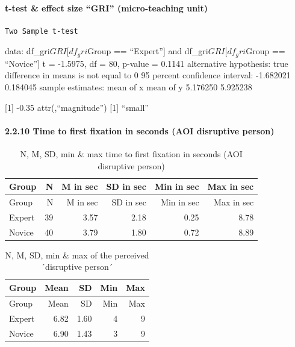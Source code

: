 \documentclass[
]{article}
\begin{document}
\paragraph{t-test \& effect size ``GRI'' (micro-teaching
unit)}\label{t-test-effect-size-gri-micro-teaching-unit}

\begin{verbatim}
Two Sample t-test
\end{verbatim}

data: df\_gri\(GRI[df_gri\)Group == ``Expert''{]} and
df\_gri\(GRI[df_gri\)Group == ``Novice''{]} t = -1.5975, df = 80,
p-value = 0.1141 alternative hypothesis: true difference in means is not
equal to 0 95 percent confidence interval: -1.682021 0.184045 sample
estimates: mean of x mean of y 5.176250 5.925238

{[}1{]} -0.35 attr(,``magnitude'') {[}1{]} ``small''

\paragraph{2.2.10 Time to first fixation in seconds (AOI disruptive
person)}\label{time-to-first-fixation-in-seconds-aoi-disruptive-person}

\begin{longtable}[]{@{}lrrrrr@{}}
\caption{N, M, SD, min \& max time to first fixation in seconds (AOI
disruptive person)}\tabularnewline
\toprule\noalign{}
Group & N & M in sec & SD in sec & Min in sec & Max in sec \\
\midrule\noalign{}
\endfirsthead
\toprule\noalign{}
Group & N & M in sec & SD in sec & Min in sec & Max in sec \\
\midrule\noalign{}
\endhead
\bottomrule\noalign{}
\endlastfoot
Expert & 39 & 3.57 & 2.18 & 0.25 & 8.78 \\
Novice & 40 & 3.79 & 1.80 & 0.72 & 8.89 \\
\end{longtable}

\begin{longtable}[]{@{}lrrrr@{}}
\caption{N, M, SD, min \& max of the perceived ´disruptive
person´}\tabularnewline
\toprule\noalign{}
Group & Mean & SD & Min & Max \\
\midrule\noalign{}
\endfirsthead
\toprule\noalign{}
Group & Mean & SD & Min & Max \\
\midrule\noalign{}
\endhead
\bottomrule\noalign{}
\endlastfoot
Expert & 6.82 & 1.60 & 4 & 9 \\
Novice & 6.90 & 1.43 & 3 & 9 \\
\end{longtable}
\end{document}
